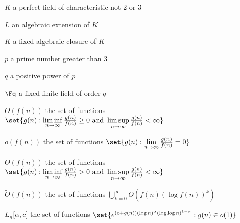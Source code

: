 
\begin{Nomencl}
    \item[$K$] a perfect field of characteristic not 2 or 3
    \item[$L$] an algebraic extension of $K$
    \item[$\bar{K}$] a fixed algebraic closure of $K$
    \item[$p$] a prime number greater than 3
    \item[$q$] a positive power of $p$
    \item[$\Fq$] a fixed finite field of order $q$
    \item[$O(f(n))$] the set of functions $\set{g(n) : \liminf\limits_{n \to \infty} \frac{g(n)}{f(n)} \geq 0 \text{ and } \limsup\limits_{n \to \infty} \frac{g(n)}{f(n)} < \infty}$
    \item[$o(f(n))$] the set of functions $\set{g(n) : \lim\limits_{n \to \infty} \frac{g(n)}{f(n)} = 0}$
    \item[$\Theta(f(n))$] the set of functions $\set{g(n) : \liminf\limits_{n \to \infty} \frac{g(n)}{f(n)} > 0 \text{ and } \limsup\limits_{n \to \infty} \frac{g(n)}{f(n)} < \infty}$
    \item[$\tilde{O}(f(n))$] the set of functions $\bigcup\limits_{k = 0}^\infty O(f(n) (\log f(n))^k)$
    \item[$L_n \lbrack \alpha, c \rbrack$] the set of functions $\set{e^{(c + g(n)) (\log n)^\alpha (\log \log n)^{1 - \alpha}} : g(n) \in o(1)}$
\end{Nomencl}
